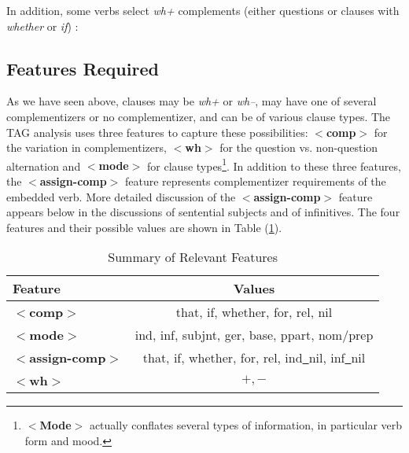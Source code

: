 
In addition, some verbs select {\it wh+} complements (either questions or
clauses with {\it whether} or {\it if}) \cite{grimshaw90}:


\subsection{Features Required}
\label{s-features}

As we have seen above, clauses may be {\it wh+} or {\it wh--}, may
have one of several complementizers or no complementizer, and can be
of various clause types.  The TAG analysis uses three features to
capture these possibilities: {\bf $<$comp$>$} for the variation in
complementizers, {\bf$<$wh$>$} for the question vs.  non-question
alternation and {\bf $<$mode$>$} for clause types\footnote{{\bf
$<$Mode$>$} actually conflates several types of information, in
particular verb form and mood.}.  In addition to these three features,
the {\bf $<$assign-comp$>$} feature represents complementizer
requirements of the embedded verb.  More detailed discussion of the
{\bf $<$assign-comp$>$} feature appears below in the discussions of
sentential subjects and of infinitives.  The four features and their
possible values are shown in Table (\ref{feat}).


\begin{table}[t]
\centering
\begin{tabular}{l|c}
Feature&Values\\
\hline
{\bf $<$comp$>$}&that, if, whether, for, rel, nil\\
\hline
{\bf$<$mode$>$}&ind, inf, subjnt, ger, base, ppart, nom/prep\\
\hline
{\bf$<$assign-comp$>$}&that, if, whether, for, rel, ind\underline{~}nil, inf\underline{~}nil\\
\hline
{\bf$<$wh$>$}&$+,-$\\
\hline
\end{tabular}
\caption{Summary of Relevant Features}
\label{feat}
\end{table}


